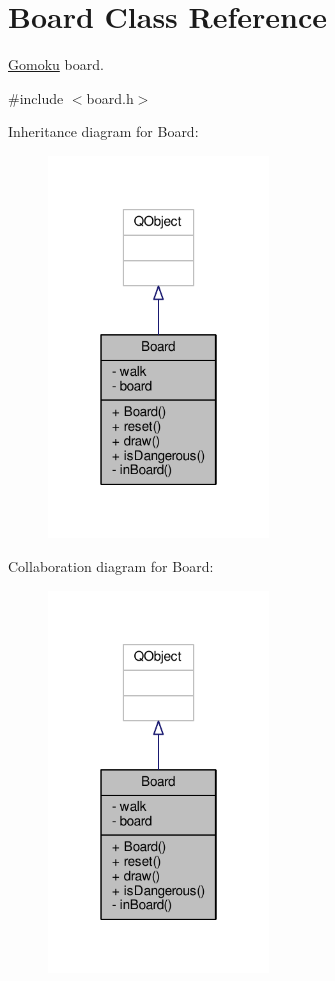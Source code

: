 \hypertarget{classBoard}{}\section{Board Class Reference}
\label{classBoard}


\hyperlink{classGomoku}{Gomoku} board.  




{\ttfamily \#include $<$board.\+h$>$}



Inheritance diagram for Board\+:
\nopagebreak
\begin{figure}[H]
\begin{center}
\leavevmode
\includegraphics[width=166pt]{classBoard__inherit__graph}
\end{center}
\end{figure}


Collaboration diagram for Board\+:
\nopagebreak
\begin{figure}[H]
\begin{center}
\leavevmode
\includegraphics[width=166pt]{classBoard__coll__graph}
\end{center}
\end{figure}
